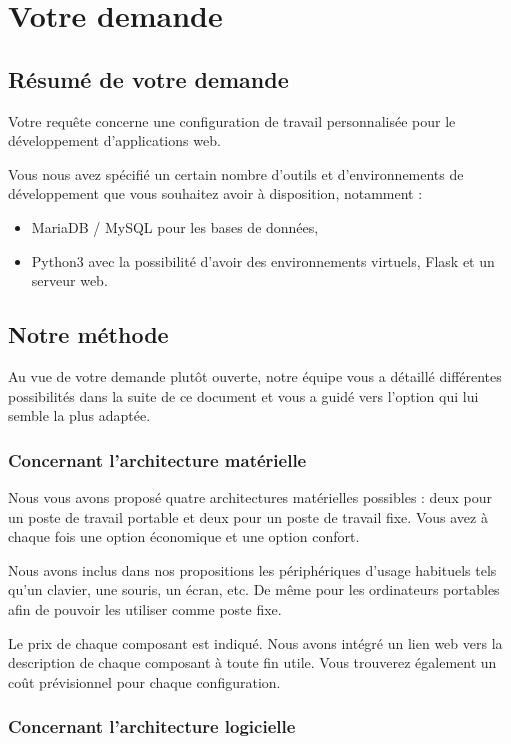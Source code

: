 \chapter{Votre demande}

\section{Résumé de votre demande}

Votre requête concerne une configuration de travail personnalisée pour le développement d'applications web. 

Vous nous avez spécifié un certain nombre d'outils et d'environnements de développement que vous souhaitez avoir à disposition, notamment : 
\begin{itemize}
\item MariaDB / MySQL pour les bases de données, 
\item Python3 avec la possibilité d'avoir des environnements virtuels, Flask et un serveur web.
\end{itemize}

\section{Notre méthode}

Au vue de votre demande plutôt ouverte, notre équipe vous a détaillé différentes possibilités dans la suite de ce document et vous a guidé vers l’option qui lui semble la plus adaptée.

\subsection{Concernant l'architecture matérielle}

Nous vous avons proposé quatre architectures matérielles possibles : deux pour un poste de travail portable et deux pour un poste de travail fixe. Vous avez à chaque fois une option économique et une option confort.

Nous avons inclus dans nos propositions les périphériques d'usage habituels tels qu'un clavier, une souris, un écran, etc. De même pour les ordinateurs portables afin de pouvoir les utiliser comme poste fixe.

Le prix de chaque composant est indiqué. Nous avons intégré un lien web vers la description de chaque composant à toute fin utile. Vous trouverez également un coût prévisionnel pour chaque configuration.

\subsection{Concernant l'architecture logicielle}

